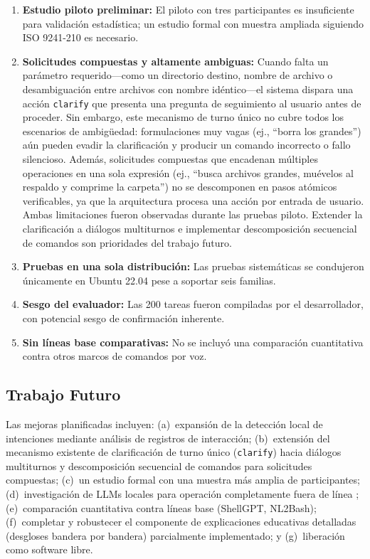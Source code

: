 \documentclass[10pt,a4paper]{article}
\begin{document}
\begin{enumerate}[noitemsep,topsep=0pt]
    \item \textbf{Estudio piloto preliminar:} El piloto con tres participantes es insuficiente para validaci\'{o}n estad\'{i}stica; un estudio formal con muestra ampliada siguiendo ISO 9241-210 \citep{ISO9241} es necesario.
    \item \textbf{Solicitudes compuestas y altamente ambiguas:} Cuando falta un par\'{a}metro requerido---como un directorio destino, nombre de archivo o desambiguaci\'{o}n entre archivos con nombre id\'{e}ntico---el sistema dispara una acci\'{o}n \texttt{clarify} que presenta una pregunta de seguimiento al usuario antes de proceder. Sin embargo, este mecanismo de turno \'{u}nico no cubre todos los escenarios de ambig\"{u}edad: formulaciones muy vagas (ej., ``borra los grandes'') a\'{u}n pueden evadir la clarificaci\'{o}n y producir un comando incorrecto o fallo silencioso. Adem\'{a}s, solicitudes compuestas que encadenan m\'{u}ltiples operaciones en una sola expresi\'{o}n (ej., ``busca archivos grandes, mu\'{e}velos al respaldo y comprime la carpeta'') no se descomponen en pasos at\'{o}micos verificables, ya que la arquitectura procesa una acci\'{o}n por entrada de usuario. Ambas limitaciones fueron observadas durante las pruebas piloto. Extender la clarificaci\'{o}n a di\'{a}logos multiturnos e implementar descomposici\'{o}n secuencial de comandos son prioridades del trabajo futuro.
    \item \textbf{Pruebas en una sola distribuci\'{o}n:} Las pruebas sistem\'{a}ticas se condujeron \'{u}nicamente en Ubuntu 22.04 pese a soportar seis familias.
    \item \textbf{Sesgo del evaluador:} Las 200 tareas fueron compiladas por el desarrollador, con potencial sesgo de confirmaci\'{o}n inherente.
    \item \textbf{Sin l\'{i}neas base comparativas:} No se incluy\'{o} una comparaci\'{o}n cuantitativa contra otros marcos de comandos por voz.
\end{enumerate}

\subsection{Trabajo Futuro}
\label{subsec:future-work}

Las mejoras planificadas incluyen: (a)~expansi\'{o}n de la detecci\'{o}n local de intenciones mediante an\'{a}lisis de registros de interacci\'{o}n; (b)~extensi\'{o}n del mecanismo existente de clarificaci\'{o}n de turno \'{u}nico (\texttt{clarify}) hacia di\'{a}logos multiturnos y descomposici\'{o}n secuencial de comandos para solicitudes compuestas; (c)~un estudio formal con una muestra m\'{a}s amplia de participantes; (d)~investigaci\'{o}n de LLMs locales para operaci\'{o}n completamente fuera de l\'{i}nea \citep{DeepSeek2025}; (e)~comparaci\'{o}n cuantitativa contra l\'{i}neas base (ShellGPT, NL2Bash); (f)~completar y robustecer el componente de explicaciones educativas detalladas (desgloses bandera por bandera) parcialmente implementado; y (g)~liberaci\'{o}n como software libre.
\end{document}
